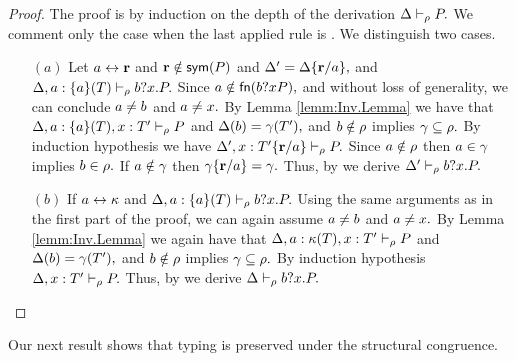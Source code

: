 \begin{proof}
The proof is by induction on the depth of the derivation $ \Delta\vdash_\rho P.$ We comment only the case when the last applied rule is . We distinguish two cases.
\begin{itemize}
\item [$(a)$] Let $a \leftrightarrow {\mathbf{r}}$ and ${\mathbf{r}}\notin \mathsf{sym}(P)$ and $\Delta'=\Delta\{{\mathbf{r}}/a\},$ and $ \Delta,a: \{a\} (T) \vdash_\rho b?x.P.$ 
Since $a\notin\mathsf{fn}(b?xP),$ and without loss of generality, we can conclude $a\not=b$ and $a\not=x.$ 
By Lemma \ref{lemm:Inv.Lemma} we have that $ \Delta,a: \{a\}(T),x: T' \vdash_{\rho} P$ and $\Delta(b)=\gamma(T'),$ and $b\notin\rho$ implies $\gamma \subseteq\rho.$ 
By induction hypothesis we have $ \Delta',x: T'\{{\mathbf{r}}/a\} \vdash_{\rho} P.$
Since $a \notin\rho$ then $a\in \gamma$ implies $b\in \rho.$ If $a\notin \gamma$ then $\gamma\{{\mathbf{r}}/a\}=\gamma.$ Thus, by  we derive $ \Delta' \vdash_\rho b?x.P.$
%
\item [$(b)$] If $a \leftrightarrow {\mathbf{\kappa}}$ and $ \Delta,a: \{a\} (T) \vdash_\rho b?x.P.$ 
Using the same arguments as in the first part of the proof, we can again assume $a\not=b$ and $a\not=x.$ 
By Lemma \ref{lemm:Inv.Lemma} we again have that $ \Delta,a: {\mathbf{\kappa}}(T),x: T' \vdash_{\rho} P$ and $\Delta(b)=\gamma(T'),$ and $b\notin\rho$ implies $\gamma \subseteq\rho.$ 
By induction hypothesis $ \Delta,x: T' \vdash_{\rho} P.$
Thus, by  we derive $ \Delta \vdash_\rho b?x.P.$
\end{itemize}
\end{proof}

Our next result shows that typing is preserved under
 the structural congruence.

